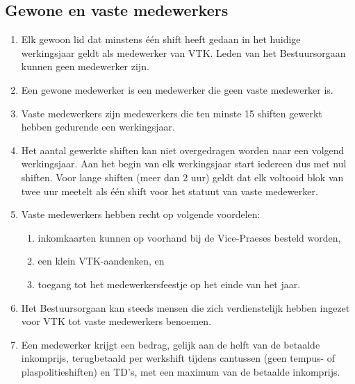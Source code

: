     \subsection{Gewone en vaste medewerkers}
    \begin{enumerate}
    \item Elk gewoon lid dat minstens één shift heeft gedaan in het huidige werkingsjaar geldt als medewerker van VTK. Leden van het Bestuursorgaan kunnen geen medewerker zijn.
    \item Een gewone medewerker is een medewerker die geen vaste medewerker is.
    \item Vaste medewerkers zijn medewerkers die ten minste 15 shiften gewerkt hebben gedurende een werkingsjaar.
    \item Het aantal gewerkte shiften kan niet overgedragen worden naar een volgend werkingsjaar. Aan het begin van elk werkingsjaar start iedereen dus met nul shiften. Voor lange shiften (meer dan 2 uur) geldt dat elk voltooid blok van twee uur meetelt als één shift voor het statuut van vaste medewerker.
    \item Vaste medewerkers hebben recht op volgende voordelen:
        \begin{enumerate}
        \item inkomkaarten kunnen op voorhand bij de Vice-Praeses besteld worden,
        \item een klein VTK-aandenken, en
        \item toegang tot het medewerkersfeestje op het einde van het jaar.
        \end{enumerate}
    \item Het Bestuursorgaan kan steeds mensen die zich verdienstelijk hebben ingezet voor VTK tot vaste medewerkers benoemen.
    \item Een medewerker krijgt een bedrag, gelijk aan de helft van de betaalde inkomprijs, terugbetaald per werkshift tijdens cantussen (geen tempus- of plaspolitieshiften) en TD’s, met een maximum van de betaalde inkomprijs. 
    \end{enumerate}

